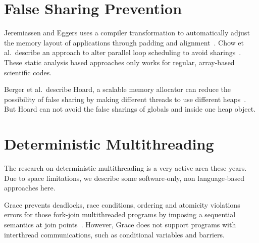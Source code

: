 \section{False Sharing Prevention}
Jeremiassen and Eggers uses a compiler transformation to automatically adjust the 
memory layout of applications through padding and alignment~\cite{falseshare:compile}.  
Chow et al.\ describe an approach to alter parallel loop scheduling to avoid
sharings~\cite{falseshare:schedule}. 
These static analysis based approaches only works for regular,
array-based scientific codes.

Berger et al.\ describe Hoard, a scalable memory allocator can reduce
the possibility of false sharing 
by making different threads to use different heaps~\cite{BergerMcKinleyBlumofeWilson:ASPLOS2000}. 
But Hoard can not avoid the false sharings of globals and inside one heap object.

\section{Deterministic Multithreading}
The research on deterministic multithreading is a very active area these years. 
Due to space limitations, we describe some software-only,
non language-based approaches here.

Grace prevents deadlocks, race conditions, ordering and atomicity violations errors
for those fork-join multithreaded programs by imposing a sequential semantics 
at join points~\cite{grace}. 
However, Grace does not support programs with interthread communications, such as
conditional variables and barriers.

